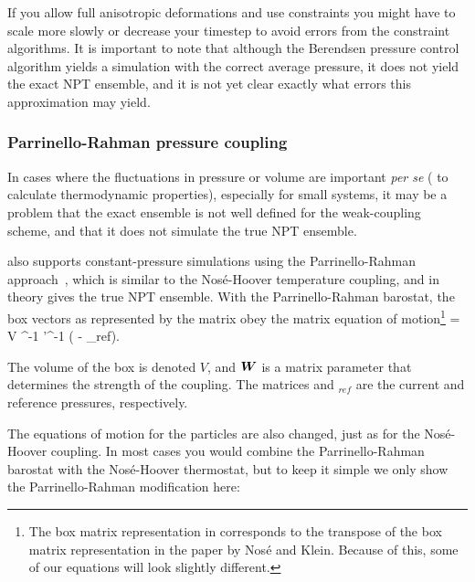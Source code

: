 \documentclass[11pt,a4paper,twoside]{article}
\begin{document}
If you allow full anisotropic deformations and use constraints you
might have to scale more slowly or decrease your timestep to avoid
errors from the constraint algorithms.  It is important to note that
although the Berendsen pressure control algorithm yields a simulation
with the correct average pressure, it does not yield the exact NPT
ensemble, and it is not yet clear exactly what errors this approximation
may yield.

\subsubsection{Parrinello-Rahman pressure coupling}

In cases where the fluctuations in pressure or volume are important
{\em per se} ({\eg} to calculate thermodynamic properties), especially
for small systems, it may be a problem that the exact ensemble is not
well defined for the weak-coupling scheme, and that it does not
simulate the true NPT ensemble.

{\gromacs} also supports constant-pressure simulations using the
Parrinello-Rahman approach~\cite{Parrinello81,Nose83}, which is similar
to the Nos{\'e}-Hoover temperature coupling, and in theory gives the
true NPT ensemble.  With the Parrinello-Rahman barostat, the box
vectors as represented by the matrix  obey the matrix equation
of motion\footnote{The box matrix representation  in {\gromacs}
corresponds to the transpose of the box matrix representation 
in the paper by Nos{\'e} and Klein. Because of this, some of our
equations will look slightly different.}
\beq
{}= V ^{-1} '^{-1} \left(  - _{ref}\right).
\eeq

The volume of the box is denoted $V$, and $\mbox{\boldmath ${W}$}$ is a matrix parameter that determines
the strength of the coupling. The matrices  and $_{ref}$ are the 
current and reference pressures, respectively.

The equations of motion for the particles are also changed, just as
for the Nos{\'e}-Hoover coupling. In most cases you would combine the 
Parrinello-Rahman barostat with the Nos{\'e}-Hoover
thermostat, but to keep it simple we only show the Parrinello-Rahman 
modification here:
\end{document}
